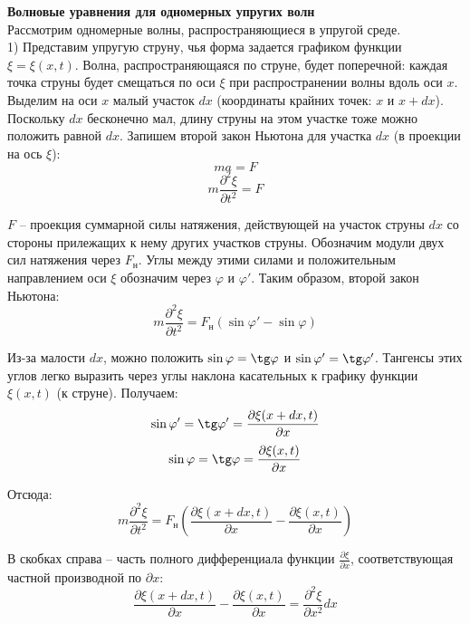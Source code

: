 \documentclass{article}
\begin{document}
	
	\textbf{Волновые уравнения для одномерных упругих волн} \\

	Рассмотрим одномерные волны, распространяющиеся в упругой среде.\\

	1) Представим упругую струну, чья форма задается графиком функции $\xi=\xi(x,t)$. Волна, распространяющаяся по струне, будет поперечной: каждая точка струны будет смещаться по оси $\xi$ при распространении волны вдоль оси $x$. Выделим на оси $x$ малый участок $dx$ (координаты крайних точек: $x$ и $x+dx$). Поскольку $dx$ бесконечно мал, длину струны на этом участке тоже можно положить равной $dx$. Запишем второй закон Ньютона для участка $dx$ (в проекции на ось $\xi$):
	\begin{equation}
		ma = F
	\end{equation}
	\begin{equation}
		m\frac{\partial^2 \xi}{\partial t^2} = F
	\end{equation}

	$F$ -- проекция суммарной силы натяжения, действующей на участок струны $dx$ со стороны прилежащих к нему других участков струны. Обозначим модули двух сил натяжения через $F_\text{н}$. Углы между этими силами и положительным направлением оси $\xi$ обозначим через $\varphi$ и $\varphi'$. Таким образом, второй закон Ньютона:
	\begin{equation}
		m\frac{\partial^2 \xi}{\partial t^2} = F_\text{н}(\sin\varphi' - \sin\varphi)
	\end{equation}

	Из-за малости $dx$, можно положить $\sin\varphi = \tg\varphi$ и $\sin\varphi' = \tg\varphi'$. Тангенсы этих углов легко выразить через углы наклона касательных к графику функции $\xi(x,t)$ (к струне). Получаем:
	\begin{equation}
		\sin\varphi' = \tg\varphi' = \frac{\partial\xi(x+dx,t)}{\partial x}
	\end{equation}
	\begin{equation}
		\sin\varphi = \tg\varphi = \frac{\partial\xi(x,t)}{\partial x}
	\end{equation}

	Отсюда:
	\begin{equation}
		m\frac{\partial^2 \xi}{\partial t^2} = F_\text{н}(\frac{\partial\xi(x+dx,t)}{\partial x} - \frac{\partial\xi(x,t)}{\partial x})
	\end{equation}

	В скобках справа -- часть полного дифференциала функции $\frac{\partial\xi}{\partial x}$, соответствующая частной производной по $\partial x$:
	\begin{equation}
		\frac{\partial\xi(x+dx,t)}{\partial x} - \frac{\partial\xi(x,t)}{\partial x} = \frac{\partial^2 \xi}{\partial x^2}dx
	\end{equation}
\end{document}
